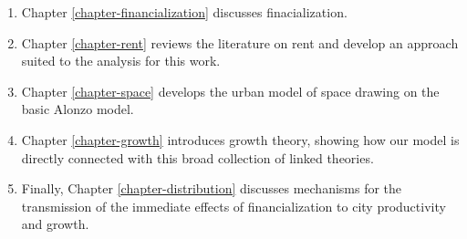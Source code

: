 \begin{enumerate}
    \item Chapter \ref{chapter-financialization} discusses finacialization. %
    \item     Chapter \ref{chapter-rent} reviews the literature on rent and develop an approach suited to the analysis for this work.
    \item Chapter \ref{chapter-space} develops the urban model of space drawing on the basic Alonzo model.
    \item Chapter \ref{chapter-growth} introduces growth theory, showing how our model is directly connected with this broad collection of linked theories. %
    \item Finally, Chapter \ref{chapter-distribution} discusses mechanisms for the transmission of  the immediate effects of financialization to city productivity and growth.
    

\end{enumerate}
 

